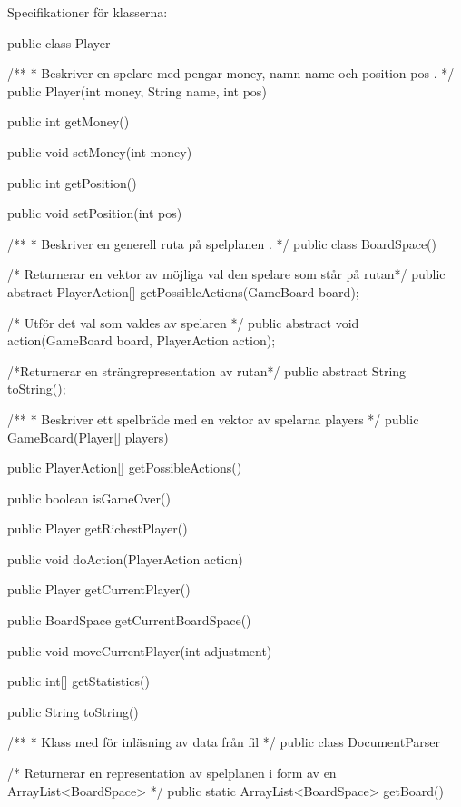 Specifikationer för klasserna:
\newline
\begin{Code}
public class Player{
/**
 * Beskriver en spelare med pengar money, namn name och position pos .
 */
public Player(int money, String name, int pos)

public int getMoney()

public void setMoney(int money)

public int getPosition()

public void setPosition(int pos)
}

\end{Code}

\begin{Code}
/**
 * Beskriver en generell ruta på spelplanen .
 */
public class BoardSpace(){

/* Returnerar en vektor av möjliga val den spelare som står på rutan*/
public abstract PlayerAction[] getPossibleActions(GameBoard board);

/* Utför det val som valdes av spelaren */
public abstract void action(GameBoard board, PlayerAction action);

/*Returnerar en strängrepresentation av rutan*/
public abstract String toString();

}

\end{Code}

\begin{Code}
/**
 * Beskriver ett spelbräde med en vektor av spelarna players
 */
public GameBoard(Player[] players) {

public PlayerAction[] getPossibleActions()

public boolean isGameOver()

public Player getRichestPlayer()

public void doAction(PlayerAction action)

public Player getCurrentPlayer()

public BoardSpace getCurrentBoardSpace()

public void moveCurrentPlayer(int adjustment)

public int[] getStatistics()

public String toString()

}
\end{Code}

\begin{Code}
/**
 * Klass med för inläsning av data från fil
 */
public class DocumentParser {

/* Returnerar en representation av spelplanen i form av en ArrayList<BoardSpace> */
public static ArrayList<BoardSpace> getBoard()
}

\end{Code}




